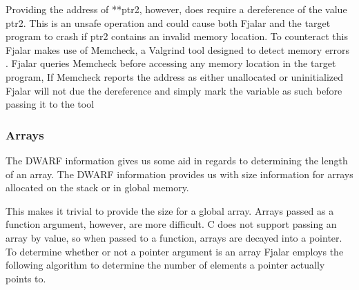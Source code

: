 \documentclass{article}
\begin{document}
Providing the address of **ptr2, however, does require a dereference
of the value ptr2. This is an unsafe operation and could cause both
Fjalar and the target program to crash if ptr2 contains an
invalid memory location. To counteract this Fjalar makes use of
Memcheck, a Valgrind tool designed to detect memory errors 
\cite{nethercote-shadow}. Fjalar queries
Memcheck before accessing any memory location in the target
program, If Memcheck reports the address as either unallocated or
uninitialized Fjalar will not due the dereference and simply mark the
variable as such before passing it to the tool

\subsubsection{Arrays}
The DWARF information gives us some aid in regards to determining the
length of an array. The DWARF information provides us with
size information for arrays allocated on the stack or in global
memory.

This makes it trivial to provide the size for a global array. Arrays
passed as a function argument, however, are more difficult. C does not
support passing an array by value, so when passed to a function,
arrays are decayed into a pointer. To determine whether or not a
pointer argument is an array Fjalar employs the following algorithm to
determine the number of elements a pointer actually points to.
\end{document}

